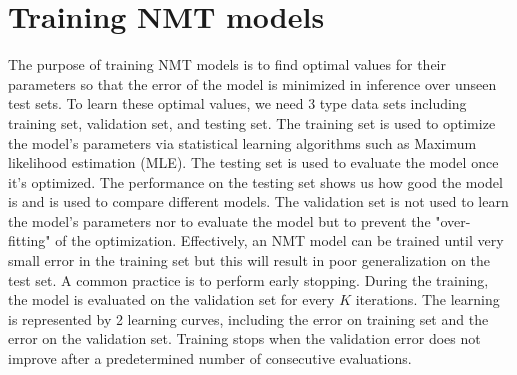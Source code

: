 \section{Training NMT models} \label{sec:train}
The purpose of training NMT models is to find optimal values for their parameters so that the error of the model is minimized in inference over unseen test sets. To learn these optimal values, we need 3 type data sets including training set, validation set, and testing set. The training set is used to optimize the model's parameters via statistical learning algorithms such as Maximum likelihood estimation (MLE)\citep{Baum87Supervised}. The testing set is used to evaluate the model once it's optimized. The performance on the testing set shows us how good the model is and is used to compare different models. The validation set is not used to learn the model's parameters nor to evaluate the model but to prevent the "over-fitting" of the optimization. Effectively, an NMT model can be trained until very small error in the training set but this will result in poor generalization on the test set. A common practice is to perform early stopping. During the training, the model is evaluated on the validation set for every $K$ iterations. The learning is represented by 2 learning curves, including the error on training set and the error on the validation set. Training stops when the validation error does not improve after a predetermined number of consecutive evaluations.


